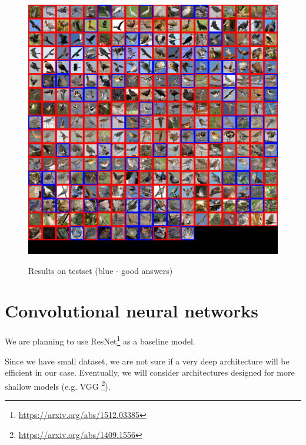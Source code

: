 \documentclass[a4paper]{article}
\begin{document}
\begin{figure}[h]
    \caption[]{Results on testset (blue - good answers)}
    \centering
    \includegraphics[page=2,width=1.0\textwidth]{eval.png}
    \label{fig:eval}
\end{figure}

\section{Convolutional neural networks}
We are planning to use {ResNet}\footnote{\url{https://arxiv.org/abs/1512.03385}}
as a baseline model.

Since we have small dataset, we are not sure if a very deep architecture
will be efficient in our case.
Eventually, we will consider architectures designed
for more shallow models (e.g. VGG \footnote{\url{https://arxiv.org/abs/1409.1556}}).
\end{document}
